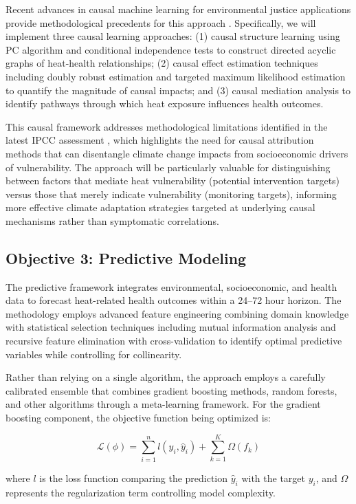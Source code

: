 Recent advances in causal machine learning for environmental justice applications provide methodological precedents for this approach \citep{Velasquez2023}. Specifically, we will implement three causal learning approaches: (1) causal structure learning using PC algorithm and conditional independence tests to construct directed acyclic graphs of heat-health relationships; (2) causal effect estimation techniques including doubly robust estimation and targeted maximum likelihood estimation to quantify the magnitude of causal impacts; and (3) causal mediation analysis to identify pathways through which heat exposure influences health outcomes. 

This causal framework addresses methodological limitations identified in the latest IPCC assessment \citep{IPCC2024}, which highlights the need for causal attribution methods that can disentangle climate change impacts from socioeconomic drivers of vulnerability. The approach will be particularly valuable for distinguishing between factors that mediate heat vulnerability (potential intervention targets) versus those that merely indicate vulnerability (monitoring targets), informing more effective climate adaptation strategies targeted at underlying causal mechanisms rather than symptomatic correlations.

\subsection{Objective 3: Predictive Modeling}
The predictive framework integrates environmental, socioeconomic, and health data to forecast heat-related health outcomes within a 24--72 hour horizon. The methodology employs advanced feature engineering combining domain knowledge with statistical selection techniques including mutual information analysis and recursive feature elimination with cross-validation to identify optimal predictive variables while controlling for collinearity.

Rather than relying on a single algorithm, the approach employs a carefully calibrated ensemble that combines gradient boosting methods, random forests, and other algorithms through a meta-learning framework. For the gradient boosting component, the objective function being optimized is:

\begin{equation}
\mathcal{L}(\phi) = \sum^n_{i=1} l(y_i, \hat{y}_i) + \sum^K_{k=1} \Omega(f_k)
\end{equation}

where $l$ is the loss function comparing the prediction $\hat{y}_i$ with the target $y_i$, and $\Omega$ represents the regularization term controlling model complexity.

